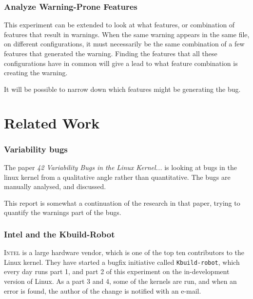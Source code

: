 \documentclass[a4paper,11pt]{report}
\begin{document}
            \subsection*{Analyze Warning-Prone Features}

This experiment can be extended to look at what features, or combination of 
features that result in warnings. When the same warning appears in the same 
file, on different configurations, it must necessarily be the same combination 
of a few features that generated the warning. Finding the features that all these
configurations have in common will give a lead to what feature combination is 
creating the warning.

It will be possible to narrow down which features might be generating the bug.

            \newpage
            \chapter{Related Work}

            \subsection*{Variability bugs}
The paper \emph{42 Variability Bugs in the Linux Kernel...}\cite{42bugs} is 
looking at bugs in the linux kernel from a qualitative angle rather than 
quantitative.  The bugs are manually analysed, and discussed.

This report is somewhat a continuation of the research in that paper, trying to 
quantify the warnings part of the bugs.


            \subsection*{Intel and the Kbuild-Robot}

\textsc{Intel} is a large hardware vendor, which is one of the top ten 
contributors to the Linux kernel\cite{gkh}. They have started a bugfix 
initiative called \texttt{Kbuild-robot}, which every day runs part 1, and part 
2 of this experiment on the in-development version of Linux. As a part 3 and 4, 
some of the kernels are run, and when an error is found, the author of the change 
is notified with an e-mail.
\end{document}
